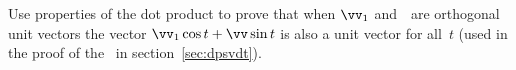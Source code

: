 \begin{exercise} \label{ex:univec} 
Use properties of the dot product to prove that when \(\vv_1\) and~\vv\ are orthogonal unit vectors the vector \(\vv_1\cos t+\vv\sin t\) is also a unit vector for all~\(t\)  (used in the proof of the \svd\ in section~\ref{sec:dpsvdt}).
\end{exercise}








\begin{comment}%
Exercise Project on searching web pages \cite[pp.4--5]{Higham2015a} with authorities and hubs leads to SVD 

why, what caused X?
how did X occur?
what-if? what-if-not?
how does X compare with Y?
what is the evidence for X?
why is X important?
\end{comment}








